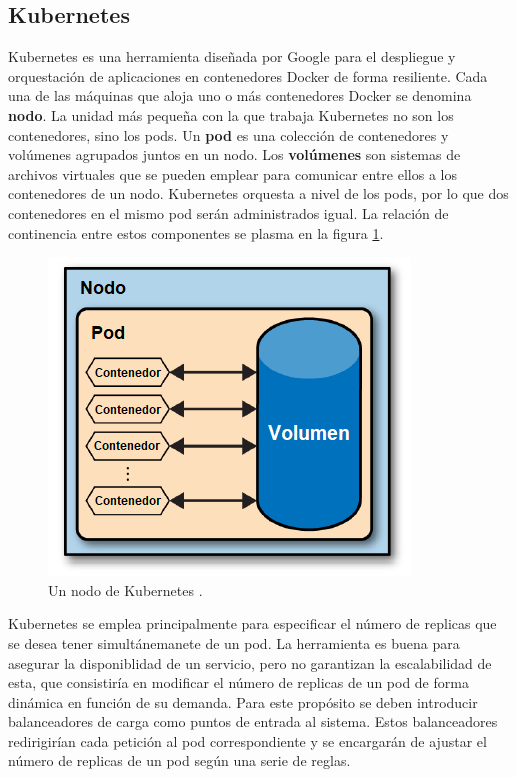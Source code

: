 \documentclass[11pt,spanish,listoffigures]{tfgetsinf}
\begin{document}
\subsection{Kubernetes} \label{subsect:Kubernetes}
Kubernetes \cite{Rensin2015} es una herramienta diseñada por Google para el despliegue y orquestación de aplicaciones en contenedores Docker de forma resiliente. Cada una de las máquinas que aloja uno o más contenedores Docker se denomina \textbf{nodo}. La unidad más pequeña con la que trabaja Kubernetes no son los contenedores, sino los pods. Un \textbf{pod} es una colección de contenedores y volúmenes agrupados juntos en un nodo. Los \textbf{volúmenes} son sistemas de archivos virtuales que se pueden emplear para comunicar entre ellos a los contenedores de un nodo. Kubernetes orquesta a nivel de los pods, por lo que dos contenedores en el mismo pod serán administrados igual. La relación de continencia entre estos componentes se plasma en la figura \ref{fig:kubernetes_ES}.

\begin{figure}[h]
\centering
\includegraphics[scale=0.9]{kubernetes_ES}
\caption{Un nodo de Kubernetes \cite{Rensin2015}.}
\label{fig:kubernetes_ES}
\end{figure}

Kubernetes se emplea principalmente para especificar el número de replicas que se desea tener simultánemanete de un pod. La herramienta es buena para asegurar la disponiblidad de un servicio, pero no garantizan la escalabilidad de esta, que consistiría en modificar el número de replicas de un pod de forma dinámica en función de su demanda. Para este propósito se deben introducir balanceadores de carga como puntos de entrada al sistema. Estos balanceadores redirigirían cada petición al pod correspondiente y se encargarán de ajustar el número de replicas de un pod según una serie de reglas.
\end{document}
